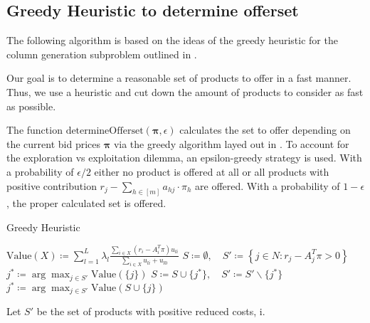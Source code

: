 \subsection{Greedy Heuristic to determine offerset}

The following algorithm is based on the ideas of the greedy heuristic for the column generation subproblem outlined in \cite{Bront.2009}.

Our goal is to determine a reasonable set of products to offer in a fast manner. Thus, we use a heuristic and cut down the amount of products to consider as fast as possible.

The function $\text{determineOfferset}(\mathbf{\pi}, \epsilon)$ calculates the set to offer depending on the current bid prices $\mathbf{\pi}$ via the greedy algorithm layed out in \cite{Bront.2009}. To account for the exploration vs exploitation dilemma, an epsilon-greedy strategy is used. With a probability of $\epsilon/2$ either no product is offered at all or all products with positive contribution $r_j - \sum_{h \in [m]} a_{hj} \cdot \pi_h$ are offered. With a probability of $1-\epsilon$, the proper calculated set is offered.


\begin{algorithm}
	\caption{Greedy Heuristic}\label{alg-GreedyHeuristic}
	\begin{algorithmic}[1] %
		\State $\text{Value}(X) \coloneqq \sum_{l=1}^{L} \lambda_l \frac{\sum_{i \in X}(r_i - A_i^T\pi)u_{li}}{\sum_{i \in X}u_{li} + u_{l0}}$
		\State $S\coloneqq \emptyset,\quad S' \coloneqq \left\{j \in N : r_j - A_j^T\pi > 0\right\}$ \label{alg-L1}
		\State $j^* \coloneqq \arg\max_{j \in S'} \text{Value}(\{j\})$
		\Repeat
		\State $S \coloneqq S \cup \{j^*\},\quad S' \coloneqq S'\backslash\{j^*\}$
		\State $j^* \coloneqq \arg \max_{j \in S'} \text{Value}(S \cup \{j\})$
	\end{algorithmic}
\end{algorithm}

Let $S'$ be the set of products with positive reduced costs, i. 

